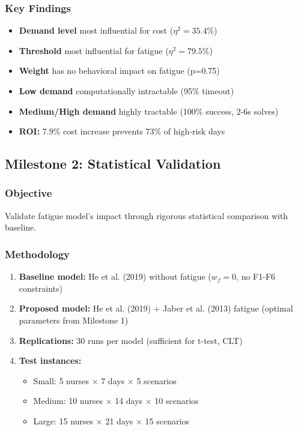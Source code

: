 \documentclass[11pt,letterpaper]{article}
\begin{document}
\subsubsection{Key Findings}
\begin{itemize}[leftmargin=*]
    \item \textbf{Demand level} most influential for cost ($\eta^2=35.4\%$)
    \item \textbf{Threshold} most influential for fatigue ($\eta^2=79.5\%$)
    \item \textbf{Weight} has no behavioral impact on fatigue (p=0.75)
    \item \textbf{Low demand} computationally intractable (95\% timeout)
    \item \textbf{Medium/High demand} highly tractable (100\% success, 2-6s solves)
    \item \textbf{ROI:} 7.9\% cost increase prevents 73\% of high-risk days
\end{itemize}

\subsection{Milestone 2: Statistical Validation}

\subsubsection{Objective}
Validate fatigue model's impact through rigorous statistical comparison with baseline.

\subsubsection{Methodology}
\begin{enumerate}[leftmargin=*]
    \item \textbf{Baseline model:} He et al. (2019) without fatigue ($w_f = 0$, no F1-F6 constraints)
    \item \textbf{Proposed model:} He et al. (2019) + Jaber et al. (2013) fatigue (optimal parameters from Milestone 1)
    \item \textbf{Replications:} 30 runs per model (sufficient for t-test, CLT)
    \item \textbf{Test instances:}
    \begin{itemize}[leftmargin=*]
        \item Small: 5 nurses $\times$ 7 days $\times$ 5 scenarios
        \item Medium: 10 nurses $\times$ 14 days $\times$ 10 scenarios
        \item Large: 15 nurses $\times$ 21 days $\times$ 15 scenarios
    \end{itemize}
\end{enumerate}
\end{document}
